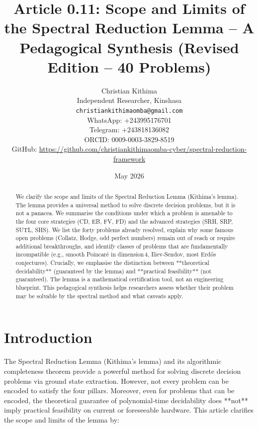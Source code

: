 \documentclass[11pt,a4paper]{article}
\title{Article 0.11: Scope and Limits of the Spectral Reduction Lemma – A Pedagogical Synthesis (Revised Edition – 40 Problems)}
\author{Christian Kithima \\
Independent Researcher, Kinshasa \\
\texttt{christiankithimaomba@gmail.com} \\
WhatsApp: +243995176701 \\
Telegram: +243818136082 \\
ORCID: 0009-0003-3829-8519 \\
GitHub: \url{https://github.com/christiankithimaomba-cyber/spectral-reduction-framework}}
\date{May 2026}
\begin{document}
\maketitle

\begin{abstract}
We clarify the scope and limits of the Spectral Reduction Lemma (Kithima’s lemma). The lemma provides a universal method to solve discrete decision problems, but it is not a panacea. We summarise the conditions under which a problem is amenable to the four core strategies (CD, EB, FV, FD) and the advanced strategies (SRH, SRP, SUTL, SHS). We list the forty problems already resolved, explain why some famous open problems (Collatz, Hodge, odd perfect numbers) remain out of reach or require additional breakthroughs, and identify classes of problems that are fundamentally incompatible (e.g., smooth Poincaré in dimension 4, Iliev‑Sendov, most Erdős conjectures). Crucially, we emphasise the distinction between **theoretical decidability** (guaranteed by the lemma) and **practical feasibility** (not guaranteed). The lemma is a mathematical certification tool, not an engineering blueprint. This pedagogical synthesis helps researchers assess whether their problem may be solvable by the spectral method and what caveats apply.
\end{abstract}

\tableofcontents

\section{Introduction}

The Spectral Reduction Lemma (Kithima’s lemma) and its algorithmic completeness theorem provide a powerful method for solving discrete decision problems via ground state extraction. However, not every problem can be encoded to satisfy the four pillars. Moreover, even for problems that can be encoded, the theoretical guarantee of polynomial‑time decidability does **not** imply practical feasibility on current or foreseeable hardware. This article clarifies the scope and limits of the lemma by:
\end{document}
